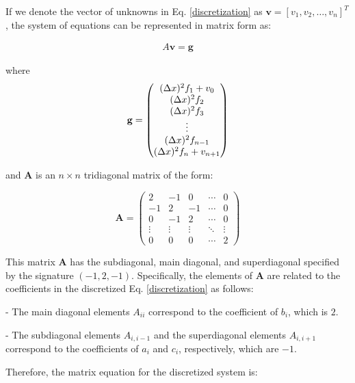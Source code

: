 
If we denote the vector of unknowns in Eq. \ref{discretization} as \( \mathbf{v} = [v_1, v_2, \ldots, v_n]^T \), the system of equations can be represented in matrix form as:


\begin{align}
    A \mathbf{v} = \mathbf{g}
    \label{Avg}
\end{align}

where
$$
    \g = \begin{pmatrix}
(\Delta x)^2 f_1 + v_0 \\
(\Delta x)^2 f_2 \\
(\Delta x)^2 f_3 \\
\vdots \\
(\Delta x)^2 f_{n-1} \\
(\Delta x)^2 f_n + v_{n+1}
\end{pmatrix}

$$



and \( \mathbf{A} \) is an \(n \times n\) tridiagonal matrix of the form:

\[
\mathbf{A} = \begin{pmatrix}
2 & -1 & 0 & \cdots & 0 \\
-1 & 2 & -1 & \cdots & 0 \\
0 & -1 & 2 & \cdots & 0 \\
\vdots & \vdots & \vdots & \ddots & \vdots \\
0 & 0 & 0 & \cdots & 2
\end{pmatrix}
\]

This matrix \( \mathbf{A} \) has the subdiagonal, main diagonal, and superdiagonal specified by the signature \( (-1, 2, -1) \). Specifically, the elements of \( \mathbf{A} \) are related to the coefficients in the discretized Eq. \ref{discretization} as follows:

- The main diagonal elements \( A_{ii} \) correspond to the coefficient of \( b_i \), which is \( 2 \).

- The subdiagonal elements \( A_{i,i-1} \) and the superdiagonal elements \( A_{i,i+1} \) correspond to the coefficients of \( a_{i} \) and \( c_{i} \), respectively, which are \( -1 \).

Therefore, the matrix equation for the discretized system is:

